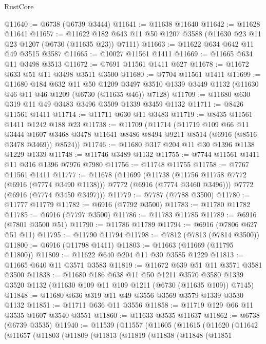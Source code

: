 \begin{lexlean}{RustCore}
\begin{coremodule}
@11640 := @6738 (@6739 @3444)
@11641 := @11638 @11640
@11642 := @11628 @11641
@11657 := @11622 @182 @643 @11 @50 @1207 @3588 (@11630 @23 @11 @23 @1207 (@6730 (@11635 @23)) @7111)
@11663 := @11622 @634 @642 @11 @49 @3515 @3587
@11665 := @10027 @11561 @1411
@11669 := @11665 @634 @11 @3498 @3513
@11672 := @7691 @11561 @1411 @627
@11678 := @11672 @633 @51 @11 @3498 @3511 @3500
@11680 := @7704 @11561 @1411
@11699 := @11680
    @184
    @632
    @11
    @50
    @1209
    @3497
    @3510
    @1339
    @3449
    @1132
    (@11630 @46 @11 @46 @1209 (@6730 (@11635 @46)) @7128)
@11709 := @11680 @630 @319 @11 @49 @3483 @3496 @3509 @1339 @3459 @1132
@11711 := @8426 @11561 @1411
@11714 := @11711 @630 @11 @3483
@11719 := @8435 @11561 @1411 @1242 @188 @23
@11738 := @11709
    (@11714
      (@11719
        @109
        @66
        @11
        @3444
        @1607
        @3468
        @3478
        @11641
        @8486
        @8494
        @9211
        @8514
        (@6916 (@8516 @3478 @3469))
        @8524))
@11746 := @11680 @317 @204 @11 @30 @1396 @1138 @1229 @1339
@11748 := @11746 @3489 @1132
@11755 := @7744 @11561 @1411 @11 @316 @1396 @7976 @7980
@11756 := @11748 @11755
@11758 := @7767 @11561 @1411
@11777 := @11678
    (@11699
      (@11738 (@11756 @11758 @7772 (@6916 (@7774 @3490 @1138))) @7772 (@6916 (@7774 @3460 @3496)))
      @7772
      (@6916 (@7774 @3450 @3497)))
@11779 := @7787 (@7788 @3500)
@11780 := @11777 @11779
@11782 := @6916 (@7792 @3500)
@11783 := @11780 @11782
@11785 := @6916 (@7797 @3500)
@11786 := @11783 @11785
@11789 := @6916 (@7801 @3500 @51)
@11790 := @11786 @11789
@11794 := @6916 (@7806 @627 @51 @11)
@11795 := @11790 @11794
@11798 := @7812 (@7813 (@7814 @3500))
@11800 := @6916 (@11798 @1411)
@11803 := @11663 (@11669 (@11795 @11800))
@11809 := @11622 @640 @204 @11 @30 @3585 @1229
@11813 := @11665 @640 @11 @3571 @3583
@11819 := @11672 @639 @51 @11 @3571 @3581 @3500
@11838 := @11680
    @186
    @638
    @11
    @50
    @1211
    @3570
    @3580
    @1339
    @3520
    @1132
    (@11630 @109 @11 @109 @1211 (@6730 (@11635 @109)) @7145)
@11848 := @11680 @636 @319 @11 @49 @3556 @3569 @3579 @1339 @3530 @1132
@11851 := @11711 @636 @11 @3556
@11858 := @11719 @129 @66 @11 @3535 @1607 @3540 @3551
@11860 := @11633 @3535 @11637
@11862 := @6738 (@6739 @3535)
@11940 := @11539
    (@11557
      (@11605
        (@11615
          (@11620
            (@11642
              (@11657
                (@11803
                  (@11809
                    (@11813
                      (@11819
                        (@11838
                          (@11848
                            (@11851

\end{coremodule}
\end{lexlean}
